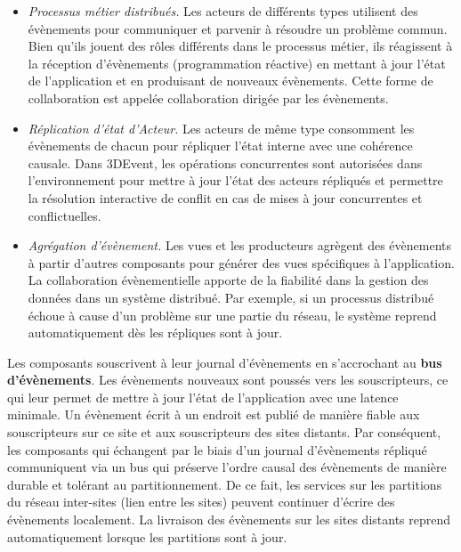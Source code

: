 \begin{itemize}
	\item \textit{Processus métier distribués.} Les acteurs de différents types 
	utilisent des évènements pour communiquer et parvenir à résoudre un problème 
	commun. Bien qu'ils jouent des rôles différents dans le processus métier, ils 
	réagissent à la réception d'évènements (programmation réactive) en 
	mettant à jour l'état de l'application et en produisant de nouveaux évènements. 
	Cette forme de collaboration est appelée collaboration dirigée par les 
	évènements.
	\item\textit{Réplication d'état d'Acteur.} Les acteurs de même type consomment 
	les évènements de chacun pour répliquer l'état interne avec une cohérence 
	causale. Dans 3DEvent, les opérations concurrentes sont autorisées dans 
	l'environnement pour mettre à jour l'état des acteurs répliqués et permettre la 
	résolution interactive de conflit en cas de mises à jour concurrentes et 
	conflictuelles. 
	\item \textit{Agrégation d'évènement.} Les vues et les producteurs agrègent des 
	évènements à partir d'autres composants pour générer des vues spécifiques à 
	l'application.
	La collaboration évènementielle apporte de la fiabilité dans la gestion des 
	données dans un système distribué. Par exemple, si un processus distribué 
	échoue à cause d'un problème sur une partie du réseau, le système reprend 
	automatiquement dès les répliques sont à jour.
\end{itemize}

Les composants souscrivent à leur journal d'évènements en s'accrochant au 
\textbf{bus d'évènements}.
Les évènements nouveaux sont poussés vers les souscripteurs, 
ce qui leur permet de mettre à jour l'état de l'application avec une latence 
minimale. 
Un évènement écrit à un endroit est publié de manière fiable aux souscripteurs sur 
ce site et aux souscripteurs des sites distants. 
Par conséquent, les composants qui échangent par le biais d'un 
journal d'évènements répliqué communiquent via un bus qui préserve l'ordre causal 
des évènements de manière durable et tolérant au partitionnement. De ce fait, les 
services sur les partitions du réseau inter-sites (lien entre les sites) peuvent 
continuer d'écrire des évènements localement. La livraison des évènements sur 
les sites distants reprend automatiquement lorsque les partitions sont à jour.



